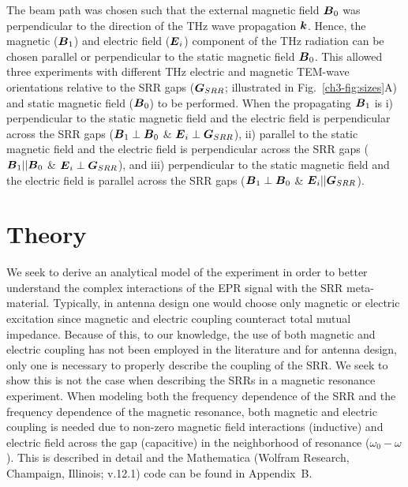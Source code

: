 The beam path was chosen such that the external magnetic field $\boldsymbol{B}_{0}$ was perpendicular to the direction of the THz wave propagation $\boldsymbol{k}$. Hence, the magnetic ($\boldsymbol{B}_{1}$) and electric field ($\boldsymbol{E}_{i}$) component of the THz radiation can be chosen parallel or perpendicular to the static magnetic field $\boldsymbol{B}_{0}$. This allowed three experiments with different THz electric and magnetic TEM-wave orientations relative to the SRR gaps ($\boldsymbol{G}_{SRR}$; illustrated in Fig.~\ref{ch3-fig:sizes}A) and static magnetic field ($\boldsymbol{B}_{0}$) to be performed. When the propagating $\boldsymbol{B}_{1}$ is i) perpendicular to the static magnetic field and the electric field is perpendicular across the SRR gaps ($\boldsymbol{B}_{1} \perp \boldsymbol{B}_{0}$ \& $\boldsymbol{E}_{i}\perp\boldsymbol{G}_{SRR}$), ii) parallel to the static magnetic field and the electric field is perpendicular across the SRR gaps ($\boldsymbol{B}_{1} || \boldsymbol{B}_{0}$ \& $\boldsymbol{E}_{i}\perp\boldsymbol{G}_{SRR}$), and iii) perpendicular to the static magnetic field and the electric field is parallel across the SRR gaps ($\boldsymbol{B}_{1} \perp \boldsymbol{B}_{0}$ \& $\boldsymbol{E}_{i}||\boldsymbol{G}_{SRR}$).

\section{Theory}
We seek to derive an analytical model of the experiment in order to better understand the complex interactions of the EPR signal with the SRR meta-material. Typically, in antenna design one would choose only magnetic \cite{srrmodel} or electric \cite{Katsarakis04} excitation since magnetic and electric coupling counteract total mutual impedance. Because of this, to our knowledge, the use of both magnetic and electric coupling has not been employed in the literature and for antenna design, only one is necessary to properly describe the coupling of the SRR. \cite{Baena2005,DurnSindreu2012,Bojanic2014,Su2015} We seek to show this is not the case when describing the SRRs in a magnetic resonance experiment. When modeling both the frequency dependence of the SRR and the frequency dependence of the magnetic resonance, both magnetic and electric coupling is needed due to non-zero magnetic field interactions (inductive) and electric field across the gap (capacitive) in the neighborhood of resonance ($\omega_0 - \omega$). This is described in detail and the Mathematica (Wolfram Research, Champaign, Illinois; v.12.1) code can be found in Appendix~B.

